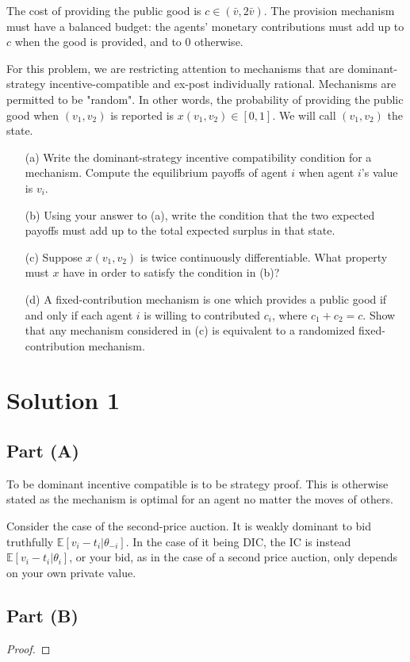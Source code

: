 \documentclass[10pt,a4paper]{article}
\begin{document}
  The cost of providing the public good is $c \in (\bar{v}, 2\bar{v})$. The provision mechanism must have a balanced budget: the agents' monetary contributions must add up to $c$ when the good is provided, and to 0 otherwise.

  For this problem, we are restricting attention to mechanisms that are dominant-strategy incentive-compatible and ex-post individually rational. Mechanisms are permitted to be "random". In other words, the probability of providing the public good when $(v_1, v_2)$ is reported is $x(v_1, v_2) \in [0, 1]$. We will call $(v_1, v_2)$ the state.

  \begin{enumerate}
      \item[(a)] Write the dominant-strategy incentive compatibility condition for a mechanism. Compute the equilibrium payoffs of agent $i$ when agent $i$'s value is $v_i$.
      \item[(b)] Using your answer to (a), write the condition that the two expected payoffs must add up to the total expected surplus in that state.
      \item[(c)] Suppose $x(v_1, v_2)$ is twice continuously differentiable. What property must $x$ have in order to satisfy the condition in (b)?
      \item[(d)] A fixed-contribution mechanism is one which provides a public good if and only if each agent $i$ is willing to contributed $c_i$, where $c_1 + c_2 = c$. Show that any mechanism considered in (c) is equivalent to a randomized fixed-contribution mechanism.
  \end{enumerate}

\section*{Solution 1}
  \subsection*{Part (A)}
  To be dominant incentive compatible is to be strategy proof. This is otherwise stated as the mechanism is optimal for an agent no matter the moves of others. 

  Consider the case of the second-price auction. It is weakly dominant to bid truthfully $\mathbb{E}[v_i-t_i|\theta_{-i}]$. In the case of it being DIC, the IC is instead $\mathbb{E}[v_i-t_i|\theta_{i}]$, or your bid, as in the case of a second price auction, only depends on your own private value.
  \subsection*{Part (B)}
  \begin{proof}

  \end{proof}
\end{document}
